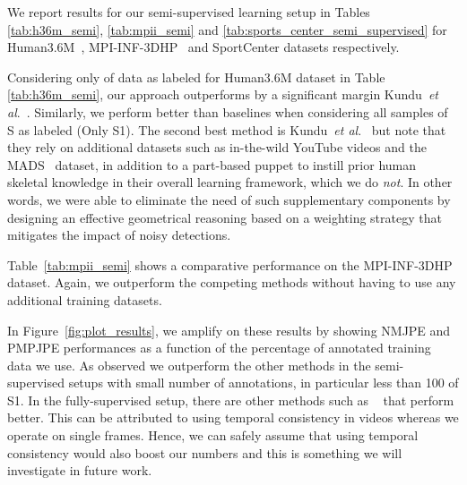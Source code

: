 \documentclass[runningheads]{llncs}
\def\etal{\emph{et al}.}     \usepackage[pagebackref=true,breaklinks=true,colorlinks,bookmarks=false]{hyperref}
\begin{document}
We report results for our semi-supervised learning setup in Tables \ref{tab:h36m_semi}, \ref{tab:mpii_semi} and \ref{tab:sports_center_semi_supervised} for Human3.6M~\cite{Ionescu14a}, MPI-INF-3DHP~\cite{Mehta17a} and SportCenter datasets respectively. 

Considering only  of data as labeled for Human3.6M dataset in Table \ref{tab:h36m_semi},  our approach outperforms by a significant margin Kundu~\etal~\cite{Kundu20}. Similarly, we perform better than baselines when considering all samples of S as labeled (Only S1). The second best method is Kundu~\etal~\cite{Kundu20} but note that they rely on additional datasets such as in-the-wild YouTube videos and the MADS~\cite{Zhang17f} dataset, in addition to a part-based puppet to instill prior human skeletal knowledge in their overall learning framework, which we do {\it not}. In other words, we were able to eliminate  the need of such supplementary components by designing an effective geometrical reasoning based on a weighting strategy that mitigates the impact of noisy detections. 

Table~\ref{tab:mpii_semi} shows a comparative performance on the MPI-INF-3DHP dataset. Again, we outperform the competing methods without having to use any additional training datasets. 

In Figure~\ref{fig:plot_results}, we amplify on these results by showing NMJPE and PMPJPE performances as a function of the percentage of annotated training data we use. As observed we outperform the other methods in the semi-supervised setups with small number of annotations, in particular less than 100 of S1. In the fully-supervised setup, there are other methods such as ~\cite{Pavllo19} that perform better. This can be attributed to using temporal consistency in videos whereas we operate on single frames. Hence, we can safely assume that using temporal consistency would also boost our numbers and this is something we will investigate in future work.

\begin{figure*}[t]
    \centering
    \quad
{}\caption{\small Comparison with Pavllo~\etal~\cite{Pavllo19}, Kundu~\etal~\cite{Kundu20} and our semi-supervised variant with the triangulation of Iskakov~\cite{Iskakov19} on (left) NMPJPE and (right) PMPJPE metrics on Human3.6m with different amount of supervision.}
    \label{fig:plot_results}
\end{figure*}
 
\end{document}
